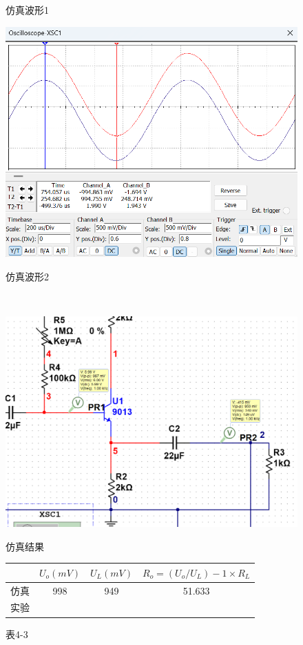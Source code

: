 \documentclass[a4paper,10pt,notitlepage]{article}
\begin{document}
\begin{figure}[h]
\begin{minipage}{0.28\textwidth}
			\caption*{仿真波形1}
		\end{minipage}
		\qquad
		\begin{minipage}{0.28\textwidth}
			\centering
			\includegraphics[width=\textwidth]{8.png}
			\caption*{仿真波形2}
		\end{minipage}
		\\
		\begin{minipage}{0.28\textwidth}
			\centering
			\includegraphics[width=\textwidth]{7-1.png}
			\caption*{仿真结果}
		\end{minipage}
		\qquad
		\begin{tabular}{|c|c|c|c|}
			\hline
			& $U_o(mV)$ & $U_L(mV)$ & $R_o=(U_o/U_L)-1 \times R_L$ \\
			\hline
			仿真 & 998 & 949 & 51.633 \\
			\hline
			实验 & \quad & \quad & \qquad  \\
			\hline
		\end{tabular}
		\caption*{表4-3}
	\end{figure}
	\newpage
\end{document}
